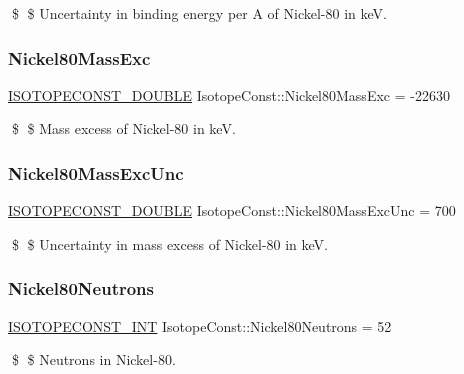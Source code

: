 \$ \$ Uncertainty in binding energy per A of Nickel-\/80 in keV. \mbox{\label{group___isotope_const-_nickel-_ni80_ga237b5a8402f1e58a25957220ed780149}} 
\subsubsection{\texorpdfstring{Nickel80\+Mass\+Exc}{Nickel80MassExc}}
{\footnotesize\ttfamily \mbox{\hyperlink{group___isotope_const-_macros_ga8f45a7272ce02c0b4c65c44636ed719a}{I\+S\+O\+T\+O\+P\+E\+C\+O\+N\+S\+T\+\_\+\+D\+O\+U\+B\+LE}} Isotope\+Const\+::\+Nickel80\+Mass\+Exc = -\/22630}

\$ \$ Mass excess of Nickel-\/80 in keV. \mbox{\label{group___isotope_const-_nickel-_ni80_gae211c7863985beda4da756802c515342}} 
\subsubsection{\texorpdfstring{Nickel80\+Mass\+Exc\+Unc}{Nickel80MassExcUnc}}
{\footnotesize\ttfamily \mbox{\hyperlink{group___isotope_const-_macros_ga8f45a7272ce02c0b4c65c44636ed719a}{I\+S\+O\+T\+O\+P\+E\+C\+O\+N\+S\+T\+\_\+\+D\+O\+U\+B\+LE}} Isotope\+Const\+::\+Nickel80\+Mass\+Exc\+Unc = 700}

\$ \$ Uncertainty in mass excess of Nickel-\/80 in keV. \mbox{\label{group___isotope_const-_nickel-_ni80_gac42074da1a58e2c8b3f4f17e6c6af093}} 
\subsubsection{\texorpdfstring{Nickel80\+Neutrons}{Nickel80Neutrons}}
{\footnotesize\ttfamily \mbox{\hyperlink{group___isotope_const-_macros_ga5f18360b3e99483a35c32d789e62621c}{I\+S\+O\+T\+O\+P\+E\+C\+O\+N\+S\+T\+\_\+\+I\+NT}} Isotope\+Const\+::\+Nickel80\+Neutrons = 52}

\$ \$ Neutrons in Nickel-\/80. \mbox{\label{group___isotope_const-_nickel-_ni80_gac7f81bcd2bf30596c727e4871a39e8c1}} 
